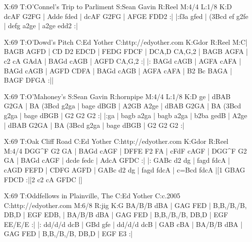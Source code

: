 \documentclass{article}
\begin{document}
\begin{abc}[name]
X:69
T:O'Connel's Trip to Parliment
S:Sean Gavin
R:Reel
M:4/4
L:1/8
K:D
dcAF G2FG | Adde fded | dcAF G2FG | AFGE FDD2 :|
|:f3a gfed | (3Bcd ef g2fe | defg a2ge | a2ge edd2 :|
\end{abc}

\begin{abc}[name]
X:69
T:O'Dowd's Pitch
C:Ed Yother
C:http://edyother.com
K:Gdor
R:Reel
M:C|
BAGB AGFD | CD D2 EDCD | FEDG FDCF | DCA,D CA,G,2 |
BAGB AGFA | c2 cA GAdA | BAGd cAGB | AGFD CA,G,2 :|
|: BAGd cAGB | AGFA cAFA | BAGd cAGB | AGFD CDFA |
BAGd cAGB | AGFA cAFA | B2 Bc BAGA | BAGF DFGA :||
\end{abc}

\begin{abc}[name]
X:69
T:O'Mahoney's
S:Sean Gavin
R:hornpipe
M:4/4
L:1/8
K:D
ge | dBAB G2GA | BA (3Bcd g2ga | bage dBGB | A2GB A2ge |
dBAB G2GA | BA (3Bcd g2ga | bage dBGB | G2 G2 G2 :|
|:ga | bagb a2ga | bagb a2ga | b2ba gedB | A2ge |
dBAB G2GA | BA (3Bcd g2ga | bage dBGB | G2 G2 G2 :|
\end{abc}

\begin{abc}[name]
X:69
T:Oak Cliff Road
C:Ed Yother
C:http://edyother.com
K:Gdor
R:Reel
M:4/4
DGG^F G2 GA | BAGd cAGF | DFFE F2 FA | cFdF cAGF |
DGG^F G2 GA | BAGd cAGF | dcde fedc | AdcA GFDC :|
|: GABc d2 dg | fagd fdcA | cAGD FEFD | CDFG AGFD |
GABc d2 dg | fagd fdcA | c=Bcd fdcA |[1 GBAG FDCD :|[2 c2 cA GFDC |]
\end{abc}

\begin{abc}[name]
X:69
T:Oddfellows in Plainville, The
C:Ed Yother
C:c.2005
C:http://edyother.com
M:6/8
R:jig
K:G
BA/B/B dBA | GAG FED | B,B,/B,/B, DB,D | EGF EDB, |
BA/B/B dBA | GAG FED | B,B,/B,/B, DB,D | EGF EE/E/E :|
|: dd/d/d dcB | GBd gfe | dd/d/d dcB | GAB cBA |
BA/B/B dBA | GAG FED | B,B,/B,/B, DB,D | EGF E3 :|
\end{abc}
\end{document}
